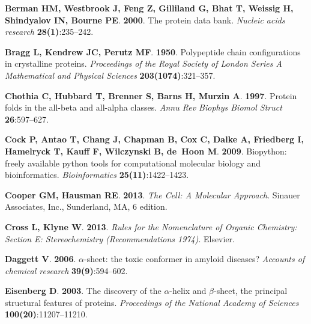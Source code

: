\documentclass[fleqn,10pt,lineno]{wlpeerj} %
\begin{document}
\begin{thebibliography}{58}
\textbf{Berman HM, Westbrook J, Feng Z, Gilliland G, Bhat T, Weissig H,
  Shindyalov IN, Bourne PE}. \textbf{2000}.
\newblock The protein data bank.
\newblock \emph{Nucleic acids research} \textbf{28(1)}:235--242.

\textbf{Bragg L, Kendrew JC, Perutz MF}. \textbf{1950}.
\newblock Polypeptide chain configurations in crystalline proteins.
\newblock \emph{Proceedings of the Royal Society of London Series A
  Mathematical and Physical Sciences} \textbf{203(1074)}:321--357.

\textbf{Chothia C, Hubbard T, Brenner S, Barns H, Murzin A}. \textbf{1997}.
\newblock Protein folds in the all-beta and all-alpha classes.
\newblock \emph{Annu Rev Biophys Biomol Struct} \textbf{26}:597--627.

\textbf{Cock P, Antao T, Chang J, Chapman B, Cox C, Dalke A, Friedberg I,
  Hamelryck T, Kauff F, Wilczynski B, de~Hoon M}. \textbf{2009}.
\newblock Biopython: freely available python tools for computational molecular
  biology and bioinformatics.
\newblock \emph{Bioinformatics} \textbf{25(11)}:1422--1423.

\textbf{Cooper GM, Hausman RE}. \textbf{2013}.
\newblock \emph{The Cell: A Molecular Approach}.
\newblock Sinauer Associates, Inc., Sunderland, MA, 6 edition.

\textbf{Cross L, Klyne W}. \textbf{2013}.
\newblock \emph{Rules for the Nomenclature of Organic Chemistry: Section E:
  Stereochemistry (Recommendations 1974)}.
\newblock Elsevier.

\textbf{Daggett V}. \textbf{2006}.
\newblock $\alpha$-sheet: the toxic conformer in amyloid diseases?
\newblock \emph{Accounts of chemical research} \textbf{39(9)}:594--602.

\textbf{Eisenberg D}. \textbf{2003}.
\newblock The discovery of the $\alpha$-helix and $\beta$-sheet, the principal
  structural features of proteins.
\newblock \emph{Proceedings of the National Academy of Sciences}
  \textbf{100(20)}:11207--11210.


\end{thebibliography}
\end{document}
